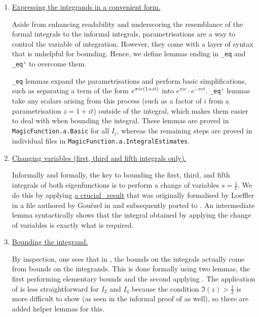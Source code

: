 \begin{enumerate}
    \item \underline{Expressing the integrands in a convenient form.}

    Aside from enhancing readability and underscoring the resemblance of the formal integrals to the informal integrals, parametrisations are a way to control the variable of integration. However, they come with a layer of syntax that is unhelpful for bounding. Hence, we define lemmas ending in \lstinline|_eq| and \lstinline|_eq'| to overcome them.
    
    \lstinline|_eq| lemmas expand the parametrisations and perform basic simplifications, such as separating a term of the form $e^{\pi i r\left( 1 + it \right)}$ into $e^{\pi i r} \cdot e^{-\pi r t}$. \lstinline|_eq'| lemmas take any scalars arising from this process (such as a factor of $i$ from a parametrisation $z = 1 + it$) outside of the integral, which makes them easier to deal with when bounding the integral. These lemmas are proved in \lstinline|MagicFunction.a.Basic| for all $I_j$, whereas the remaining steps are proved in individual files in \lstinline|MagicFunction.a.IntegralEstimates|.

    \item \underline{Changing variables (first, third and fifth integrals only).}

    Informally and formally, the key to bounding the first, third, and fifth integrals of both eigenfunctions is to perform a change of variables $s = \frac{1}{t}$. We do this by applying \href{https://github.com/leanprover-community/mathlib4/blob/5a2eaa85c555c4263e15928cef249cbaad2eb2d2/Mathlib/MeasureTheory/Function/Jacobian.lean#L1199}{a crucial \mathlib\ result} that was originally formalised by Loeffler in a file authored by Gouëzel in  and subsequently ported to . An intermediate lemma syntactically shows that the integral obtained by applying the change of variables is exactly what is required.

    \item \underline{Bounding the integrand.}

    By inspection, one sees that in , the bounds on the integrals actually come from bounds on the integrands. This is done formally using two lemmas, the first performing elementary bounds and the second applying . The application of  is less straightforward for $I_2$ and $I_4$ because the condition $\Im(z) > \frac{1}{2}$ is more difficult to show (as seen in the informal proof of  as well), so there are added helper lemmas for this.


\end{enumerate}
